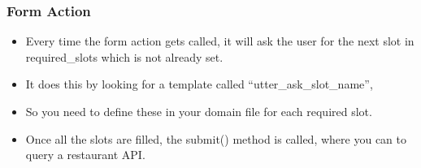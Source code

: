  \begin{frame}[fragile]\frametitle{Form Action}
\begin{itemize}
\item Every time the form action gets called, it will ask the user for the next slot in required\_slots which is not already set. 
\item It does this by looking for a template called ``utter\_ask\_{slot\_name}'', 
\item So you need to define these in your domain file for each required slot.
\item Once all the slots are filled, the submit() method is called, where you can to query a restaurant API.
\end{itemize}
\end{frame}